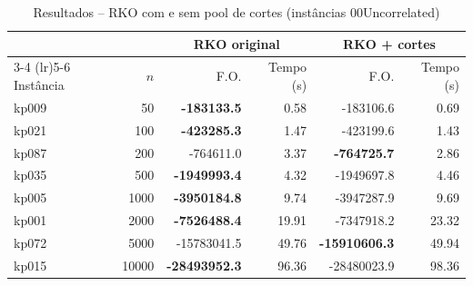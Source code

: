 \begin{table}[htbp]
\centering
\caption{Resultados -- RKO com e sem pool de cortes (instâncias 00Uncorrelated)}
\label{tab:cuts}
\begin{tabular}{lrrrrr}
\toprule
 & & \multicolumn{2}{c}{\textbf{RKO original}} & \multicolumn{2}{c}{\textbf{RKO + cortes}} \\
\cmidrule(lr){3-4} \cmidrule(lr){5-6}
Instância & $n$ & F.O. & Tempo (s) & F.O. & Tempo (s) \\
\midrule
kp009 & 50 & \textbf{-183133.5} & 0.58 & -183106.6 & 0.69 \\
kp021 & 100 & \textbf{-423285.3} & 1.47 & -423199.6 & 1.43 \\
kp087 & 200 & -764611.0 & 3.37 & \textbf{-764725.7} & 2.86 \\
kp035 & 500 & \textbf{-1949993.4} & 4.32 & -1949697.8 & 4.46 \\
kp005 & 1000 & \textbf{-3950184.8} & 9.74 & -3947287.9 & 9.69 \\
kp001 & 2000 & \textbf{-7526488.4} & 19.91 & -7347918.2 & 23.32 \\
kp072 & 5000 & -15783041.5 & 49.76 & \textbf{-15910606.3} & 49.94 \\
kp015 & 10000 & \textbf{-28493952.3} & 96.36 & -28480023.9 & 98.36 \\
\bottomrule
\end{tabular}
\end{table}
